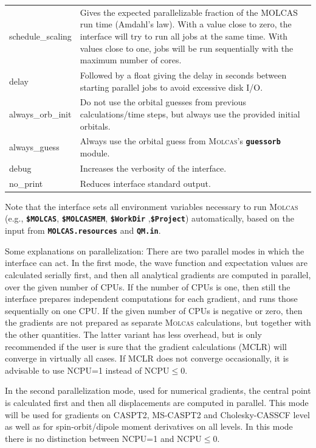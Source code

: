 \documentclass[a4paper,10pt,DIV=15,openany]{scrbook}
\newcommand{\ttt}[1]{\textbf{\texttt{#1}}}
\begin{document}
\begin{table}
\begin{tabular}{>{\ttfamily}lp{12cm}}
schedule\_scaling &Gives the expected parallelizable fraction of the MOLCAS run time (Amdahl's law). With a value close to zero, the interface will try to run all jobs at the same time. With values close to one, jobs will be run sequentially with the maximum number of cores.\\
delay           &Followed by a float giving the delay in seconds between starting parallel jobs to avoid excessive disk I/O.\\
always\_orb\_init &Do not use the orbital guesses from previous calculations/time steps, but always use the provided initial orbitals.\\
always\_guess   &Always use the orbital guess from \textsc{Molcas}'s \ttt{guessorb} module.\\
  debug           &Increases the verbosity of the interface.\\
  no\_print       &Reduces interface standard output.\\
  \hline
  \end{tabular}
\end{table}

Note that the interface sets all environment variables necessary to run \textsc{Molcas} (e.g., \ttt{\$MOLCAS}, \ttt{\$MOLCASMEM}, \ttt{\$WorkDir} ,\ttt{\$Project}) automatically, based on the input from \ttt{MOLCAS.resources} and \ttt{QM.in}.

Some explanations on parallelization: There are two parallel modes in which the interface can act. In the first mode, the wave function and expectation values are calculated serially first, and then all analytical gradients are computed in parallel, over the given number of CPUs. If the number of CPUs is one, then still the interface prepares independent computations for each gradient, and runs those sequentially on one CPU. If the given number of CPUs is negative or zero, then the gradients are not prepared as separate \textsc{Molcas} calculations, but together with the other quantities. The latter variant has less overhead, but is only recommended if the user is sure that the gradient calculations (MCLR) will converge in virtually all cases. If MCLR does not converge occasionally, it is advisable to use NCPU=1 instead of NCPU$\leq$0.

In the second parallelization mode, used for numerical gradients, the central point is calculated first and then all displacements are computed in parallel. This mode will be used for gradients on CASPT2, MS-CASPT2 and Cholesky-CASSCF level as well as for spin-orbit/dipole moment derivatives on all levels. In this mode there is no distinction between NCPU=1 and NCPU$\leq$0. 
\end{document}

